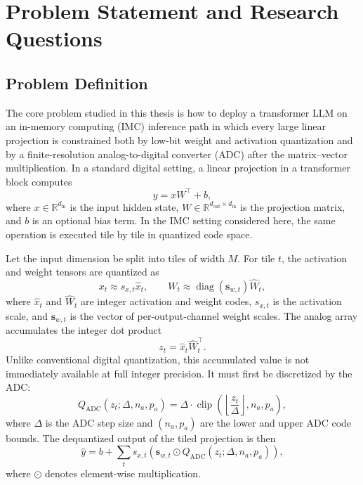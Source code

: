 \documentclass[a4paper,11pt,oneside]{article}
\theoremstyle{breakstyle}
\begin{document}
\section{Problem Statement and Research Questions}
\label{sec:problem_statement}

\subsection{Problem Definition}
\label{subsec:problem_definition}

The core problem studied in this thesis is how to deploy a
transformer LLM on an in-memory computing (IMC) inference path in
which every large linear projection is constrained both by low-bit
weight and activation quantization and by a finite-resolution
analog-to-digital converter (ADC) after the matrix--vector
multiplication.  In a standard digital setting, a linear projection
in a transformer block computes
\begin{equation}
    y = x W^\top + b,
\end{equation}
where \(x \in \mathbb{R}^{d_{\mathrm{in}}}\) is the input hidden state, \(W \in \mathbb{R}^{d_{\mathrm{out}} \times d_{\mathrm{in}}}\) is the projection matrix, and \(b\) is an optional bias term. In the IMC setting considered here, the same operation is executed tile by tile in quantized code space.

Let the input dimension be split into tiles of width \(M\). For tile \(t\), the activation and weight tensors are quantized as
\begin{equation}
    x_t \approx s_{x,t} \hat{x}_t, 
    \qquad
    W_t \approx \operatorname{diag}(\mathbf{s}_{w,t}) \hat{W}_t,
\end{equation}
where \(\hat{x}_t\) and \(\hat{W}_t\) are integer activation and weight codes, \(s_{x,t}\) is the activation scale, and \(\mathbf{s}_{w,t}\) is the vector of per-output-channel weight scales. The analog array accumulates the integer dot product
\begin{equation}
    z_t = \hat{x}_t \hat{W}_t^\top .
\end{equation}
Unlike conventional digital quantization, this accumulated value is not immediately available at full integer precision. It must first be discretized by the ADC:
\begin{equation}
    Q_{\mathrm{ADC}}(z_t; \Delta, n_a, p_a)
    =
    \Delta \cdot
    \operatorname{clip}
    \left(
        \left\lfloor \frac{z_t}{\Delta} \right\rfloor,
        n_a,
        p_a
    \right),
\end{equation}
where \(\Delta\) is the ADC step size and \((n_a,p_a)\) are the lower and upper ADC code bounds. The dequantized output of the tiled projection is then
\begin{equation}
    \hat{y}
    =
    b
    +
    \sum_t
    s_{x,t}
    \left(
        \mathbf{s}_{w,t}
        \odot
        Q_{\mathrm{ADC}}(z_t; \Delta, n_a, p_a)
    \right),
\end{equation}
where \(\odot\) denotes element-wise multiplication.
\end{document}
